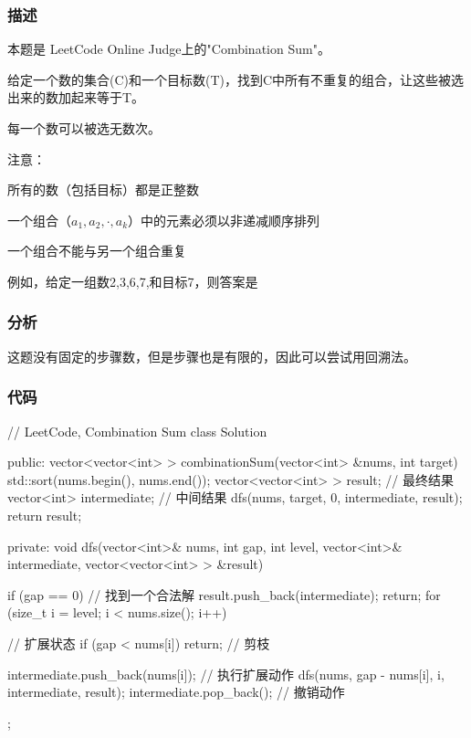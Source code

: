 \subsubsection{描述}
本题是 LeetCode Online Judge上的"Combination Sum"。

给定一个数的集合(C)和一个目标数(T)，找到C中所有不重复的组合，让这些被选出来的数加起来等于T。

每一个数可以被选无数次。

注意：
\begindot
\item 所有的数（包括目标）都是正整数
\item 一个组合（$a_1,a_2,\cdot,a_k$）中的元素必须以非递减顺序排列
\item 一个组合不能与另一个组合重复
\myenddot

例如，给定一组数2,3,6,7,和目标7，则答案是
\begin{Code}
[7]
[2, 2, 3] 
\end{Code}

\subsubsection{分析}
这题没有固定的步骤数，但是步骤也是有限的，因此可以尝试用回溯法。

\subsubsection{代码}

\begin{Codex}[label=combination_sum.cpp]
// LeetCode, Combination Sum
class Solution {
public:
    vector<vector<int> > combinationSum(vector<int> &nums, int target) {
        std::sort(nums.begin(), nums.end());
        vector<vector<int> > result; // 最终结果
        vector<int> intermediate; // 中间结果
        dfs(nums, target, 0, intermediate, result);
        return result;
    }

private:
    void dfs(vector<int>& nums, int gap, int level, vector<int>& intermediate,
            vector<vector<int> > &result) {
        if (gap == 0) {  // 找到一个合法解
            result.push_back(intermediate);
            return;
        }
        for (size_t i = level; i < nums.size(); i++) { // 扩展状态
            if (gap < nums[i]) return; // 剪枝

            intermediate.push_back(nums[i]); // 执行扩展动作
            dfs(nums, gap - nums[i], i, intermediate, result);
            intermediate.pop_back();  // 撤销动作
        }
    }
};
\end{Codex}


